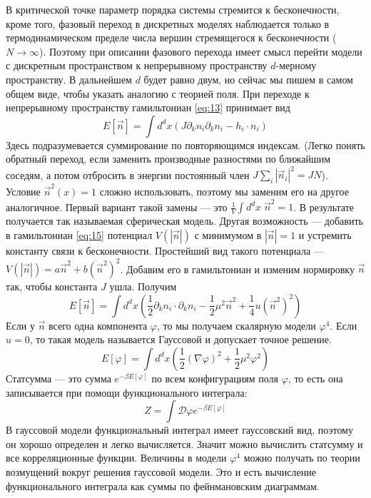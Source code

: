 \documentclass[a4paper,12pt]{article}
\theoremstyle{definition}
\theoremstyle{definition}
\theoremstyle{definition}
\begin{document}
В критической точке параметр порядка системы стремится к бесконечности, кроме того, фазовый переход в дискретных моделях наблюдается только в термодинамическом пределе числа вершин стремящегося к бесконечности ($N\to \infty$). Поэтому при описании фазового перехода имеет смысл перейти модели с дискретным пространством  к непрерывному пространству $d$-мерному пространству. В дальнейшем $d$ будет равно двум, но сейчас мы пишем в самом общем виде, чтобы указать аналогию с теорией поля.
При переходе к непрерывному пространству гамильтониан \eqref{eq:13} принимает вид
\begin{equation}
  \label{eq:15}
  E[\vec n]=\int d^d x \left(J\partial_kn_i\partial_k  n_i-h_i\cdot n_i\right)
\end{equation}
Здесь подразумевается суммирование по повторяющимся индексам. (Легко понять обратный переход, если заменить производные разностями по ближайшим соседям, а потом отбросить в энергии постоянный член $J\sum_i \left|\vec n_i\right|^2=JN$).
Условие $\vec n^2(x)=1$ сложно использовать, поэтому мы заменим его на другое аналогичное. Первый вариант такой замены --- это $\frac{1}{V}\int d^dx\; \vec n^2=1$. В результате получается так называемая сферическая модель. Другая возможность --- добавить в гамильтониан \eqref{eq:15} потенциал $V(\left|\vec n\right|)$ с минимумом в $\left|\vec n\right|=1$ и устремить константу связи к бесконечности. Простейший вид такого потенциала --- $V(\left|\vec n\right|)=a\vec n^2+b\left(\vec n^2\right)^2$. Добавим его в гамильтониан и изменим нормировку $\vec n$ так, чтобы константа $J$ ушла. Получим
\begin{equation}
  \label{eq:16}
  E[\vec n]=\int d^d x \left(\frac{1}{2}\partial_k n_i\cdot \partial_k n_i-\frac{1}{2}\mu^2 \vec n^2+\frac{1}{4}u\left(\vec n^2\right)^2\right)
\end{equation}
Если у $\vec n$ всего одна компонента $\varphi$, то мы получаем скалярную модели $\varphi^4$. Если $u=0$, то такая модель называется Гауссовой и допускает точное решение.
\begin{equation}
  \label{eq:17}
  E[\varphi]=\int d^d x (\frac{1}{2}(\nabla \varphi)^2+\frac{1}{2}\mu^2 \varphi^2)
\end{equation}
Статсумма --- это сумма $e^{-\beta E[\varphi]}$ по всем конфигурациям поля $\varphi$, то есть она записывается при помощи функционального интеграла:
\begin{equation}
  \label{eq:18}
  Z=\int \mathcal{D}\varphi e^{-\beta E[\varphi]}
\end{equation}
В гауссовой модели функциональный интеграл имеет гауссовский вид, поэтому он хорошо определен и легко вычисляется. Значит можно вычислить статсумму и все корреляционные функции. Величины в модели $\varphi^4$ можно получать по теории возмущений вокруг решения гауссовой модели. Это и есть вычисление функционального интеграла как суммы по фейнмановским диаграммам. 
\end{document}
